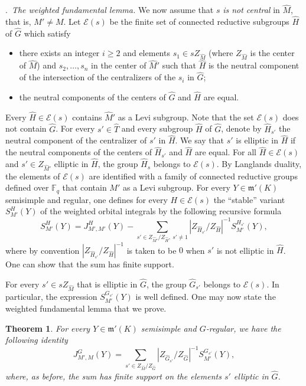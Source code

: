 \documentclass[12pt,a4paper,oneside,english,leqno]{smfart}
\makeatletter
\numberwithin{equation}{subsection}
\newcounter{theo}
\numberwithin{theo}{subsection}
\newenvironment{paragr}[1][]{\medskip\refstepcounter{subsection}%
  \par\noindent\hspace*{\parindent}\thesubsection.\ \emph{#1}%
  \@ifundefined{@empty}{}{}\ignorespaces}{\medskip}
\theoremstyle{plain}
\newtheorem{theoreme}[theo]{Theorem}
\theoremstyle{definition}
\theoremstyle{remark}
\newcommand{\Fq}{\mathbb{F}_q}
\newcommand{\ec}{\mathcal{E}}
\newcommand{\Gc}{\widehat{G}}
\newcommand{\Tc}{\widehat{T}}
\newcommand{\Mc}{\widehat{M}}
\newcommand{\Hc}{\widehat{H}}
\newcommand{\mgo}{\mathfrak{m}}
\renewcommand{\geq}{\geqslant}
\makeatother
\begin{document}
\begin{paragr}[The weighted fundamental lemma.]
We now assume that $s$ \emph{is not central} in $\Mc$, that is, $M'\not=M$. Let $\ec(s)$ be the finite set of connected reductive subgroups $\Hc$ of $\Gc$ which satisfy
\begin{itemize}
\item there exists an integer $i\geq 2$ and elements $s_1\in s Z_{\Mc}$ (where $Z_{\Mc}$ is the center of $\Mc$) and $s_2, \dots, s_n$ in the center of $\Mc'$ such that $\Hc$ is the neutral component of the intersection of the centralizers of the $s_i$ in $\Gc$; \item the neutral components of the centers of $\Gc$ and $\Hc$ are equal.
\end{itemize}
Every $\Hc\in\ec(s)$ contains $\Mc'$ as a Levi subgroup. Note that the set $\ec(s)$ does not contain $\Gc$. For every $s'\in \Tc$ and every subgroup $\Hc$ of $\Gc$, denote by $\Hc_{s'}$ the neutral component of the centralizer of $s'$ in $\Hc$. We say that $s'$ is elliptic in $\Hc$ if the neutral components of the centers of $\Hc_{s'}$ and $\Hc$ are equal. For all $\Hc\in \ec(s)$ and $s'\in Z_{\Mc'}$ elliptic in $\Hc$, the group $\Hc_{s}$ belongs to $\ec(s)$. By Langlands duality, the elements of $\ec(s)$ are identified with a family of connected reductive groups defined over $\Fq$ that contain $M'$ as a Levi subgroup. For every $Y\in \mgo'(K)$ semisimple and regular, one defines for every $H\in \ec(s)$ the “stable” variant $S_{M'}^H(Y)$ of the weighted orbital integrals by the following recursive formula
$$S_{M'}^H(Y)=J_{M',M'}^H(Y)-\sum_{s'\in Z_{\Mc'}/Z_{\Hc}, \ s'\not=1 } |Z_{\Hc_{s'}}/Z_{\Hc}|^{-1} S_{M'}^{H_{s'}}(Y),$$
where by convention $|Z_{\Hc_{s'}}/Z_{\Hc}|^{-1}$ is taken to be $0$ when $s'$ is not elliptic in $\Hc$. One can show that the sum has finite support.

For every $s'\in sZ_{\Mc}$ that is elliptic in $\Gc$, the group $\Gc_{s'}$ belongs to $\ec(s)$. In particular, the expression $S_{M'}^{G_{s'}}(Y)$ is well defined. One may now state the weighted fundamental lemma that we prove.

\begin{theoreme}\label{thm:1.4.1}
For every $Y\in \mgo'(K)$ semisimple and $G$-regular, we have the following identity
$$  J^G_{M',M}(Y)=\sum_{s'\in Z_{\Mc}/Z_{\Gc}} |Z_{\Gc_{s'}}/Z_{\Gc}|^{-1} S_{M'}^{G_{s'}}(Y),$$
where, as before, the sum has finite support on the elements $s'$ elliptic in $\Gc$.
\end{theoreme}

\end{paragr}
\end{document}

